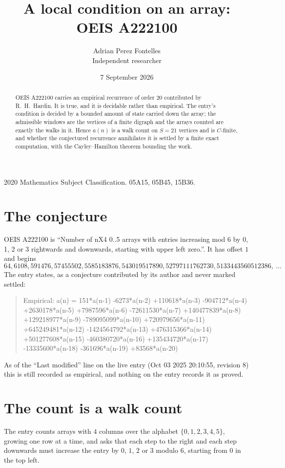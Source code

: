 \documentclass[11pt,a4paper]{article}
\title{A local condition on an array: OEIS A222100}
\author{Adrian Perez Fontelles\\ \small Independent researcher}
\date{7 September 2026}
\theoremstyle{plain}
\theoremstyle{definition}
\begin{document}
\maketitle

\begin{abstract}
OEIS A222100 carries an empirical recurrence of order $20$ contributed by R.~H.~Hardin. It is
true, and it is decidable rather than empirical. The entry's condition is decided by a bounded amount of state carried down the array; the
admissible windows are the vertices of a finite digraph and the arrays counted are exactly the
walks in it. Hence $a(n)$ is a walk count on $S=21$ vertices and is $C$-finite, and whether the
conjectured recurrence annihilates it is settled by a finite exact computation, with the
Cayley--Hamilton theorem bounding the work.
\end{abstract}

\noindent\small 2020 Mathematics Subject Classification. 05A15, 05B45, 15B36.\normalsize

\section{The conjecture}

OEIS A222100 is ``Number of nX4 0..5 arrays with entries increasing mod 6 by 0, 1, 2 or 3 rightwards and downwards, starting with upper left zero.''. It has offset $1$ and begins
\[
64, 6108, 591476, 57455502, 5585183876, 543019517890, 52797111762730, 5133443560512386,\ \dots
\]
The entry states, as a conjecture contributed by its author and never marked settled:
\begin{quote}
Empirical: a(n) = 151*a(n-1) -6273*a(n-2) +110618*a(n-3) -904712*a(n-4) +2630178*a(n-5) +7987596*a(n-6) -72611530*a(n-7) +140477839*a(n-8) +129218977*a(n-9) -789095099*a(n-10) +720979656*a(n-11) +645249481*a(n-12) -1424564792*a(n-13) +476315366*a(n-14) +501277608*a(n-15) -460380720*a(n-16) +135434720*a(n-17) -13335600*a(n-18) -361696*a(n-19) +83568*a(n-20)
\end{quote}
As of the ``Last modified'' line on the live entry (Oct 03 2025 20:10:55, revision 8) this is still
recorded as empirical, and nothing on the entry records it as proved.

\section{The count is a walk count}

The entry counts arrays with $4$ columns over the alphabet $\{0,1,2,3,4,5\}$, growing one row at a time, and asks that each step to the right and each step downwards must increase the entry by $0$, $1$, $2$ or $3$ modulo $6$, starting from $0$ in the top left.
\end{document}

